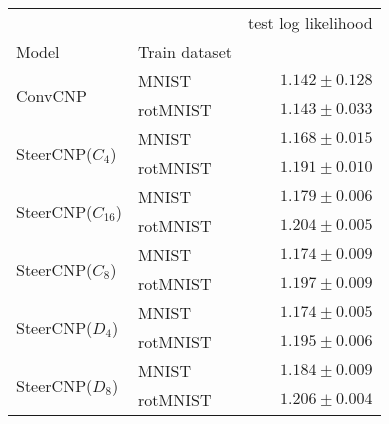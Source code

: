 \begin{table}
\centering
\label{tab:mnist}
\begin{tabular}{llr}
\toprule
                &          &         test log likelihood \\
Model & Train dataset &                             \\
\midrule
\multirow{2}{*}{ConvCNP} & MNIST &  $\mathbf{1.142 \pm 0.128}$ \\
                & rotMNIST &         ${1.143 \pm 0.033}$ \\
\cline{1-3}
\multirow{2}{*}{SteerCNP($C_4$)} & MNIST &         ${1.168 \pm 0.015}$ \\
                & rotMNIST &         ${1.191 \pm 0.010}$ \\
\cline{1-3}
\multirow{2}{*}{SteerCNP($C_{16}$)} & MNIST &         ${1.179 \pm 0.006}$ \\
                & rotMNIST &  $\mathbf{1.204 \pm 0.005}$ \\
\cline{1-3}
\multirow{2}{*}{SteerCNP($C_{8}$)} & MNIST &         ${1.174 \pm 0.009}$ \\
                & rotMNIST &         ${1.197 \pm 0.009}$ \\
\cline{1-3}
\multirow{2}{*}{SteerCNP($D_4$)} & MNIST &         ${1.174 \pm 0.005}$ \\
                & rotMNIST &         ${1.195 \pm 0.006}$ \\
\cline{1-3}
\multirow{2}{*}{SteerCNP($D_8$)} & MNIST &         ${1.184 \pm 0.009}$ \\
                & rotMNIST &  $\mathbf{1.206 \pm 0.004}$ \\
\bottomrule
\end{tabular}
\end{table}

